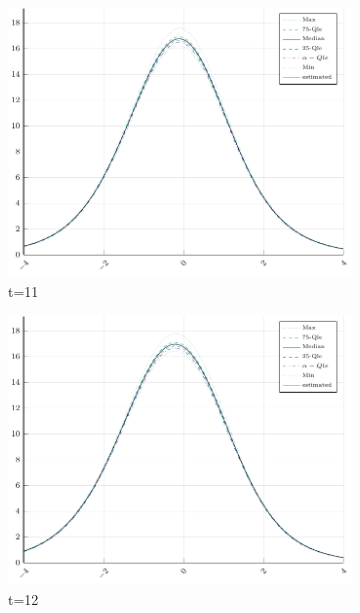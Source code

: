 \begin{figure}[H]
	
	\centering
	\begin{subfigure}[t]{0.31\textwidth}	
		\centering
		\includegraphics[width=\linewidth]{Figures/real/11_infoplot.pdf}
		\caption{t=11} 
	\end{subfigure}
	\begin{subfigure}[t]{0.31\textwidth}
		\centering
		\includegraphics[width=\linewidth]{Figures/real/12_infoplot.pdf}
		\caption{t=12} 
	\end{subfigure}\\
	\begin{subfigure}[t]{0.31\textwidth}

\end{subfigure}
\end{figure}
